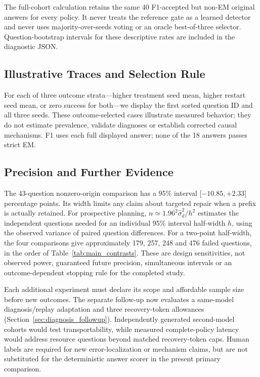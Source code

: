 \documentclass{article}
\begin{document}
The full-cohort calculation retains the same 40 F1-accepted but non-EM
original answers for every policy. It never treats the reference gate as a
learned detector and never uses majority-over-seeds voting or an oracle
best-of-three selector. Question-bootstrap intervals for these descriptive
rates are included in the diagnostic JSON.

\subsection{Illustrative Traces and Selection Rule}
For each of three outcome strata---higher treatment seed mean, higher restart
seed mean, or zero success for both---we display the first sorted question ID
and all three seeds. These outcome-selected cases illustrate measured behavior;
they do not estimate prevalence, validate diagnoses or establish corrected
causal mechanisms. F1 uses each full displayed answer; none of the 18 answers
passes strict EM.



\subsection{Precision and Further Evidence}
The 43-question nonzero-origin comparison has a 95\% interval
[$-10.85,+2.33$] percentage points. Its width limits any claim about targeted
repair when a prefix is actually retained. For prospective planning,
$n\simeq1.96^2\widehat\sigma_d^2/h^2$ estimates the independent questions
needed for an individual 95\% interval half-width $h$, using the observed
variance of paired question differences. For a two-point half-width, the
four comparisons give approximately 179, 257, 248 and 476 failed questions,
in the order of Table~\ref{tab:main_contrasts}. These are design sensitivities,
not observed power, guaranteed future precision, simultaneous intervals or
an outcome-dependent stopping rule for the completed study.

Each additional experiment must declare its scope and affordable sample
size before new outcomes. The separate follow-up now evaluates a same-model
diagnosis/replay adaptation and three recovery-token allowances
(Section~\ref{sec:diagnosis_followup}). Independently generated second-model
cohorts would test transportability, while measured complete-policy latency
would address resource questions beyond matched recovery-token caps.
Human labels are required for new error-localization or mechanism claims,
but are not substituted for the deterministic answer scorer in the present
primary comparison.
\end{document}
